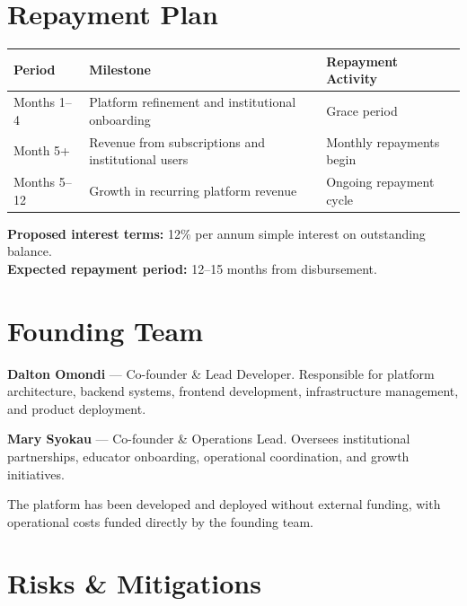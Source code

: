 \documentclass[a4paper,11pt]{article}
\begin{document}
\section{Repayment Plan}

\begin{table}[h]
\centering
\begin{tabular}{@{}p{2cm} p{5cm} p{5cm}@{}}
\toprule
\rowcolor{indigobg}
\textcolor{indigobrand}{\textbf{Period}} &
\textcolor{indigobrand}{\textbf{Milestone}} &
\textcolor{indigobrand}{\textbf{Repayment Activity}} \\
\midrule
Months 1--4   & Platform refinement and institutional onboarding        & Grace period \\
Month 5+      & Revenue from subscriptions and institutional users      & Monthly repayments begin \\
Months 5--12  & Growth in recurring platform revenue                    & Ongoing repayment cycle \\
\bottomrule
\end{tabular}
\end{table}

\textbf{Proposed interest terms:} 12\% per annum simple interest on outstanding balance.\\
\textbf{Expected repayment period:} 12--15 months from disbursement.

\section{Founding Team}

\textbf{Dalton Omondi} — Co-founder \& Lead Developer. Responsible for platform architecture, backend systems, frontend development, infrastructure management, and product deployment.

\textbf{Mary Syokau} — Co-founder \& Operations Lead. Oversees institutional partnerships, educator onboarding, operational coordination, and growth initiatives.

The platform has been developed and deployed without external funding, with operational costs funded directly by the founding team.

\section{Risks \& Mitigations}
\end{document}
